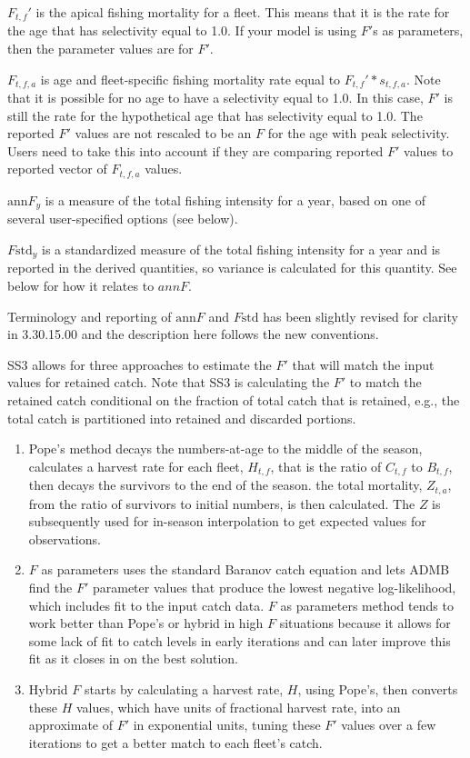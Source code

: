 $F_{t,f}'$ is the apical fishing mortality for a fleet. This means that it is the rate for the age that has selectivity equal to 1.0. If your model is using $F'$s as parameters, then the parameter values are for $F'$.

$F_{t,f,a}$ is age and fleet-specific fishing mortality rate equal to $F_{t,f}' * s_{t,f,a}$. Note that it is possible for no age to have a selectivity equal to 1.0. In this case, $F'$ is still the rate for the hypothetical age that has selectivity equal to 1.0. The reported $F'$ values are not rescaled to be an $F$ for the age with peak selectivity. Users need to take this into account if they are comparing reported $F'$ values to reported vector of $F_{t,f,a}$ values.

$\text{ann}F_y$ is a measure of the total fishing intensity for a year, based on one of several user-specified options (see below).

$F\text{std}_y$ is a standardized measure of the total fishing intensity for a year and is reported in the derived quantities, so variance is calculated for this quantity. See below for how it relates to $annF$.

Terminology and reporting of $\text{ann}F$ and $F\text{std}$ has been slightly revised for clarity in 3.30.15.00 and the description here follows the new conventions.

SS3 allows for three approaches to estimate the $F'$ that will match the input values for retained catch. Note that SS3 is calculating the $F'$ to match the retained catch conditional on the fraction of total catch that is retained, e.g., the total catch is partitioned into retained and discarded portions.

\begin{enumerate}
	\item Pope's method decays the numbers-at-age to the middle of the season, calculates a harvest rate for each fleet, $H_{t,f}$, that is the ratio of $C_{t,f}$ to $B_{t,f}$, then decays the survivors to the end of the season. the total mortality, $Z_{t,a}$, from the ratio of survivors to initial numbers, is then calculated. The $Z$ is subsequently used for in-season interpolation to get expected values for observations.
	
	\item $F$ as parameters uses the standard Baranov catch equation and lets ADMB find the $F'$ parameter values that produce the lowest negative log-likelihood, which includes fit to the input catch data. $F$ as parameters method tends to work better than Pope's or hybrid in high $F$ situations because it allows for some lack of fit to catch levels in early iterations and can later improve this fit as it closes in on the best solution.
	
	\item Hybrid $F$ starts by calculating a harvest rate, $H$, using Pope's, then converts these $H$ values, which have units of fractional harvest rate, into an approximate of $F'$ in exponential units, tuning these $F'$ values over a few iterations to get a better match to each fleet's catch.
\end{enumerate}

